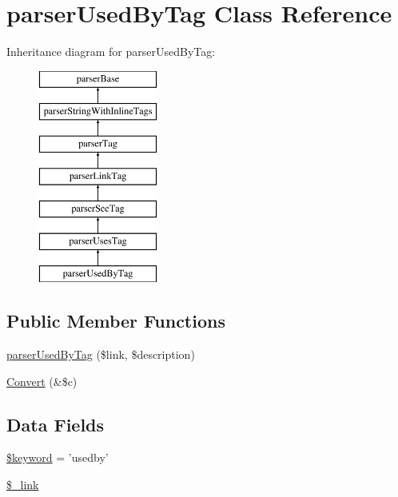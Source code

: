 \hypertarget{classparser_used_by_tag}{\section{parser\-Used\-By\-Tag \-Class \-Reference}
\label{classparser_used_by_tag}
}
\-Inheritance diagram for parser\-Used\-By\-Tag\-:\begin{figure}[H]
\begin{center}
\leavevmode
\includegraphics[height=7.000000cm]{classparser_used_by_tag}
\end{center}
\end{figure}
\subsection*{\-Public \-Member \-Functions}
\begin{DoxyCompactItemize}
\item 
\hyperlink{classparser_used_by_tag_ae60b2acd24d104f0351571fa71cdd782}{parser\-Used\-By\-Tag} (\$link, \$description)
\item 
\hyperlink{classparser_used_by_tag_ad6c06bea9d11cc1c362b592306cfa707}{\-Convert} (\&\$c)
\end{DoxyCompactItemize}
\subsection*{\-Data \-Fields}
\begin{DoxyCompactItemize}
\item 
\hyperlink{classparser_used_by_tag_a4a925d6b38bcf3957c713a7d3dc7da1f}{\$keyword} = 'usedby'
\item 
\hyperlink{classparser_used_by_tag_a054eb7a4dbfc7372b7cc31124bfbe1f3}{\$\-\_\-link}
\end{DoxyCompactItemize}


